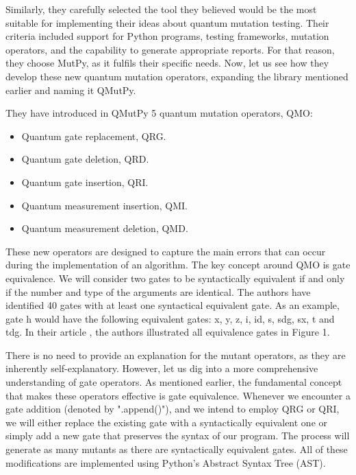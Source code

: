 \begin{itemize}
Similarly, they carefully selected the tool they believed would be the most suitable for implementing their ideas about quantum mutation testing. Their criteria included support for Python programs, testing frameworks, mutation operators, and the capability to generate appropriate reports. For that reason, they choose MutPy, as it fulfils their specific needs. Now, let us see how they develop these new quantum mutation operators, expanding the library mentioned earlier and naming it QMutPy.\newline

They have introduced in QMutPy 5 quantum mutation operators, QMO:
\begin{itemize}
    \item Quantum gate replacement, QRG.
    \item Quantum gate deletion, QRD.
    \item Quantum gate insertion, QRI.
    \item Quantum measurement insertion, QMI.
    \item Quantum measurement deletion, QMD.
\end{itemize}

\vspace{5pt}
These new operators are designed to capture the main errors that can occur during the implementation of an algorithm. The key concept around QMO is gate equivalence. We will consider two gates to be syntactically equivalent if and only if the number and type of the arguments are identical. The authors have identified 40 gates with at least one syntactical equivalent gate. As an example, gate h would have the following equivalent gates: x, y, z, i, id, s, sdg, sx, t and tdg. In their article \cite{fortunato2022mutation}, the authors illustrated all equivalence gates in Figure 1.  \newline

There is no need to provide an explanation for the mutant operators, as they are inherently self-explanatory.  However, let us dig into a more comprehensive understanding of gate operators. As mentioned earlier, the fundamental concept that makes these operators effective is gate equivalence. Whenever we encounter a gate addition (denoted by ".append()"), and we intend to employ QRG or QRI, we will either replace the existing gate with a syntactically equivalent one or simply add a new gate that preserves the syntax of our program. The process will generate as many mutants as there are syntactically equivalent gates. All of these modifications are implemented using Python's Abstract Syntax Tree (AST).\newline


\end{itemize}
